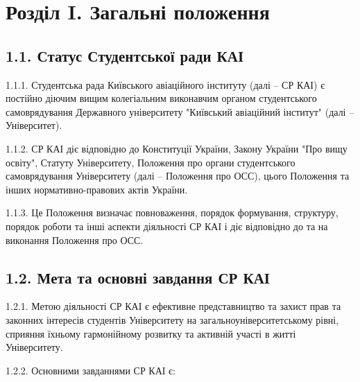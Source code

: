 \section*{Розділ I. Загальні положення}

\subsection*{1.1. Статус Студентської ради КАІ}
    1.1.1. Студентська рада Київського авіаційного інституту (далі – СР КАІ) є постійно діючим вищим колегіальним виконавчим органом студентського самоврядування Державного університету "Київський авіаційний інститут" (далі – Університет).

    1.1.2. СР КАІ діє відповідно до Конституції України, Закону України "Про вищу освіту", Статуту Університету, Положення про органи студентського самоврядування Університету (далі – Положення про ОСС), цього Положення та інших нормативно-правових актів України.

    1.1.3. Це Положення визначає повноваження, порядок формування, структуру, порядок роботи та інші аспекти діяльності СР КАІ і діє відповідно до та на виконання Положення про ОСС.

\subsection*{1.2. Мета та основні завдання СР КАІ}
    1.2.1. Метою діяльності СР КАІ є ефективне представництво та захист прав та законних інтересів студентів Університету на загальноуніверситетському рівні, сприяння їхньому гармонійному розвитку та активній участі в житті Університету.

    1.2.2. Основними завданнями СР КАІ є:

